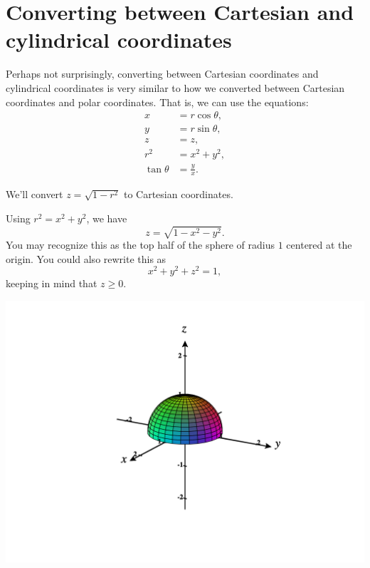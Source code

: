 \documentclass{ximera}
\begin{document}
\section*{Converting between Cartesian and cylindrical coordinates}

Perhaps not surprisingly, converting between Cartesian coordinates and cylindrical coordinates is very similar to how we converted between Cartesian coordinates and polar coordinates. That is, we can use the equations:
\begin{align*}
x &= r\cos\theta, \\
y &= r\sin\theta, \\
z &= z,\\
r^2 &= x^2 + y^2, \\
\tan\theta &= \frac{y}{x}.
\end{align*}


\begin{example}
We'll convert $z = \sqrt{1-r^2}$ to Cartesian coordinates.

Using $r^2 = x^2 + y^2$, we have
\[
z = \sqrt{1-x^2-y^2}.
\]
You may recognize this as the top half of the sphere of radius $1$ centered at the origin. You could also rewrite this as
\[
x^2+y^2+z^2=1,
\]
keeping in mind that $z\geq 0$.

\begin{image}
\includegraphics[width=\textwidth]{CalcPlot3D-half_sphere}
\end{image}

\end{example}
\end{document}
